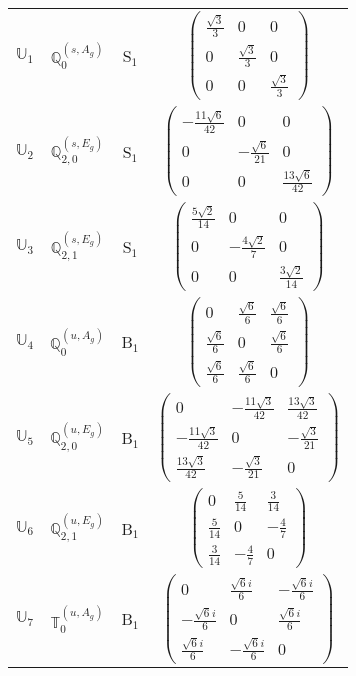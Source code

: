 \documentclass[fleqn,10pt,landscape]{article}
\begin{document}
\begin{itemize}
\begin{center}
\begin{longtable}{c|c|c|c}
$ \mathbb{U}_{1} $ & $\mathbb{Q}_{0}^{(s,A_{g})}$ & S$_{1}$ & $\begin{pmatrix} \frac{\sqrt{3}}{3} & 0 & 0 \\ 0 & \frac{\sqrt{3}}{3} & 0 \\ 0 & 0 & \frac{\sqrt{3}}{3} \end{pmatrix}$ \\
$ \mathbb{U}_{2} $ & $\mathbb{Q}_{2,0}^{(s,E_{g})}$ & S$_{1}$ & $\begin{pmatrix} - \frac{11 \sqrt{6}}{42} & 0 & 0 \\ 0 & - \frac{\sqrt{6}}{21} & 0 \\ 0 & 0 & \frac{13 \sqrt{6}}{42} \end{pmatrix}$ \\
$ \mathbb{U}_{3} $ & $\mathbb{Q}_{2,1}^{(s,E_{g})}$ & S$_{1}$ & $\begin{pmatrix} \frac{5 \sqrt{2}}{14} & 0 & 0 \\ 0 & - \frac{4 \sqrt{2}}{7} & 0 \\ 0 & 0 & \frac{3 \sqrt{2}}{14} \end{pmatrix}$ \\ \hline
$ \mathbb{U}_{4} $ & $\mathbb{Q}_{0}^{(u,A_{g})}$ & B$_{1}$ & $\begin{pmatrix} 0 & \frac{\sqrt{6}}{6} & \frac{\sqrt{6}}{6} \\ \frac{\sqrt{6}}{6} & 0 & \frac{\sqrt{6}}{6} \\ \frac{\sqrt{6}}{6} & \frac{\sqrt{6}}{6} & 0 \end{pmatrix}$ \\
$ \mathbb{U}_{5} $ & $\mathbb{Q}_{2,0}^{(u,E_{g})}$ & B$_{1}$ & $\begin{pmatrix} 0 & - \frac{11 \sqrt{3}}{42} & \frac{13 \sqrt{3}}{42} \\ - \frac{11 \sqrt{3}}{42} & 0 & - \frac{\sqrt{3}}{21} \\ \frac{13 \sqrt{3}}{42} & - \frac{\sqrt{3}}{21} & 0 \end{pmatrix}$ \\
$ \mathbb{U}_{6} $ & $\mathbb{Q}_{2,1}^{(u,E_{g})}$ & B$_{1}$ & $\begin{pmatrix} 0 & \frac{5}{14} & \frac{3}{14} \\ \frac{5}{14} & 0 & - \frac{4}{7} \\ \frac{3}{14} & - \frac{4}{7} & 0 \end{pmatrix}$ \\
$ \mathbb{U}_{7} $ & $\mathbb{T}_{0}^{(u,A_{g})}$ & B$_{1}$ & $\begin{pmatrix} 0 & \frac{\sqrt{6} i}{6} & - \frac{\sqrt{6} i}{6} \\ - \frac{\sqrt{6} i}{6} & 0 & \frac{\sqrt{6} i}{6} \\ \frac{\sqrt{6} i}{6} & - \frac{\sqrt{6} i}{6} & 0 \end{pmatrix}$ \\

\end{longtable}
\end{center}
\end{itemize}
\end{document}

